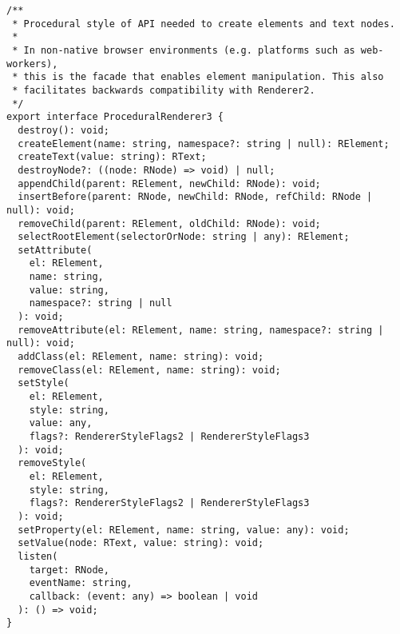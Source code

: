 \begin{verbatim}
/**
 * Procedural style of API needed to create elements and text nodes.
 *
 * In non-native browser environments (e.g. platforms such as web-workers),
 * this is the facade that enables element manipulation. This also
 * facilitates backwards compatibility with Renderer2.
 */
export interface ProceduralRenderer3 {
  destroy(): void;
  createElement(name: string, namespace?: string | null): RElement;
  createText(value: string): RText;
  destroyNode?: ((node: RNode) => void) | null;
  appendChild(parent: RElement, newChild: RNode): void;
  insertBefore(parent: RNode, newChild: RNode, refChild: RNode | null): void;
  removeChild(parent: RElement, oldChild: RNode): void;
  selectRootElement(selectorOrNode: string | any): RElement;
  setAttribute(
    el: RElement,
    name: string,
    value: string,
    namespace?: string | null
  ): void;
  removeAttribute(el: RElement, name: string, namespace?: string | null): void;
  addClass(el: RElement, name: string): void;
  removeClass(el: RElement, name: string): void;
  setStyle(
    el: RElement,
    style: string,
    value: any,
    flags?: RendererStyleFlags2 | RendererStyleFlags3
  ): void;
  removeStyle(
    el: RElement,
    style: string,
    flags?: RendererStyleFlags2 | RendererStyleFlags3
  ): void;
  setProperty(el: RElement, name: string, value: any): void;
  setValue(node: RText, value: string): void;
  listen(
    target: RNode,
    eventName: string,
    callback: (event: any) => boolean | void
  ): () => void;
}
\end{verbatim}
